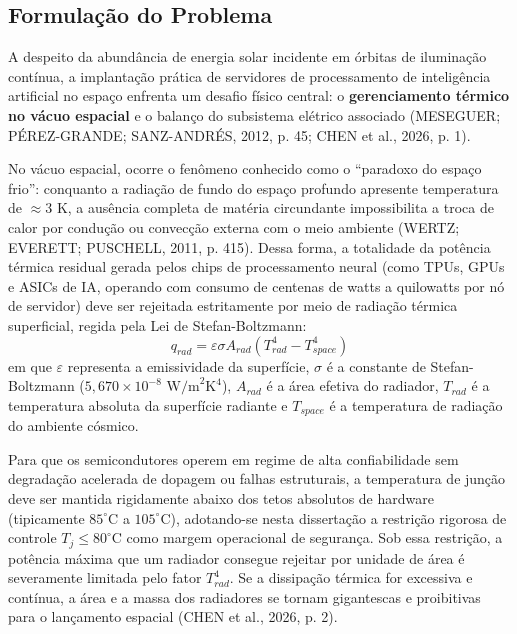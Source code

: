 \subsection{Formulação do Problema}

A despeito da abundância de energia solar incidente em órbitas de iluminação contínua, a implantação prática de servidores de processamento de inteligência artificial no espaço enfrenta um desafio físico central: o \textbf{gerenciamento térmico no vácuo espacial} e o balanço do subsistema elétrico associado (MESEGUER; PÉREZ-GRANDE; SANZ-ANDRÉS, 2012, p. 45; CHEN et al., 2026, p. 1).

No vácuo espacial, ocorre o fenômeno conhecido como o ``paradoxo do espaço frio'': conquanto a radiação de fundo do espaço profundo apresente temperatura de $\approx 3\text{ K}$, a ausência completa de matéria circundante impossibilita a troca de calor por condução ou convecção externa com o meio ambiente (WERTZ; EVERETT; PUSCHELL, 2011, p. 415). Dessa forma, a totalidade da potência térmica residual gerada pelos chips de processamento neural (como TPUs, GPUs e ASICs de IA, operando com consumo de centenas de watts a quilowatts por nó de servidor) deve ser rejeitada estritamente por meio de radiação térmica superficial, regida pela Lei de Stefan-Boltzmann:
\begin{equation}
    q_{rad} = \varepsilon \sigma A_{rad} \left( T_{rad}^4 - T_{space}^4 \right)
\end{equation}
em que $\varepsilon$ representa a emissividade da superfície, $\sigma$ é a constante de Stefan-Boltzmann ($5{,}670 \times 10^{-8}\text{ W/m}^2\text{K}^4$), $A_{rad}$ é a área efetiva do radiador, $T_{rad}$ é a temperatura absoluta da superfície radiante e $T_{space}$ é a temperatura de radiação do ambiente cósmico.

Para que os semicondutores operem em regime de alta confiabilidade sem degradação acelerada de dopagem ou falhas estruturais, a temperatura de junção deve ser mantida rigidamente abaixo dos tetos absolutos de hardware (tipicamente $85^\circ\text{C}$ a $105^\circ\text{C}$), adotando-se nesta dissertação a restrição rigorosa de controle $T_j \le 80^\circ\text{C}$ como margem operacional de segurança. Sob essa restrição, a potência máxima que um radiador consegue rejeitar por unidade de área é severamente limitada pelo fator $T_{rad}^4$. Se a dissipação térmica for excessiva e contínua, a área e a massa dos radiadores se tornam gigantescas e proibitivas para o lançamento espacial (CHEN et al., 2026, p. 2).

